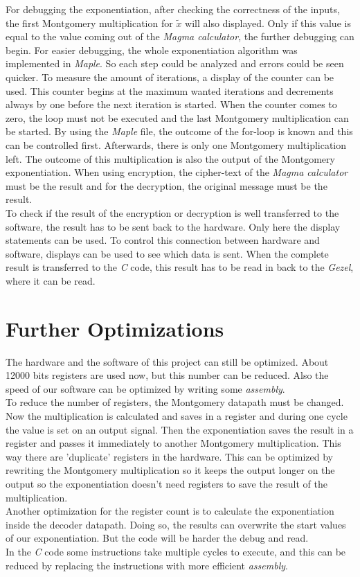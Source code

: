 \documentclass[a4paper]{article}
\begin{document}
For debugging the exponentiation, after checking the correctness of the inputs, the first Montgomery multiplication for $\tilde{x}$ will also displayed. Only if this value is equal to the value coming out of the \textit{Magma calculator}, the further debugging can begin. For easier debugging, the whole exponentiation algorithm was implemented in \textit{Maple}. So each step could be analyzed and errors could be seen quicker. To measure the amount of iterations, a display of the counter can be used. This counter begins at the maximum wanted iterations and decrements always by one before the next iteration is started. When the counter comes to zero, the loop must not be executed and the last Montgomery multiplication can be started. By using the \textit{Maple} file, the outcome of the for-loop is known and this can be controlled first. Afterwards, there is only one Montgomery multiplication left. The outcome of this multiplication is also the output of the Montgomery exponentiation. When using encryption, the cipher-text of the \textit{Magma calculator} must be the result and for the decryption, the original message must be the result.\\

To check if the result of the encryption or decryption is well transferred to the software, the result has to be sent back to the hardware. Only here the display statements can be used. To control this connection between hardware and software, displays can be used to see which data is sent. When the complete result is transferred to the \textit{C} code, this result has to be read in back to the \textit{Gezel}, where it can be read.

\section{Further Optimizations}

The hardware and the software of this project can still be optimized. About 12000 bits registers are used now, but this number can be reduced. Also the speed of our software can be optimized by writing some \textit{assembly}.\\

To reduce the number of registers, the Montgomery datapath must be changed. Now the multiplication is calculated and saves in a register and during one cycle the value is set on an output signal. Then the exponentiation saves the result in a register and passes it immediately to another Montgomery multiplication. This way there are 'duplicate' registers in the hardware. This can be optimized by rewriting the Montgomery multiplication so it keeps the output longer on the output so the exponentiation doesn't need registers to save the result of the multiplication.\\

Another optimization for the register count is to calculate the exponentiation inside the decoder datapath. Doing so, the results can overwrite the start values of our exponentiation. But the code will be harder the debug and read.\\

In the \textit{C} code some instructions take multiple cycles to execute, and this can be reduced by replacing the instructions with more efficient \textit{assembly}.
\end{document}
